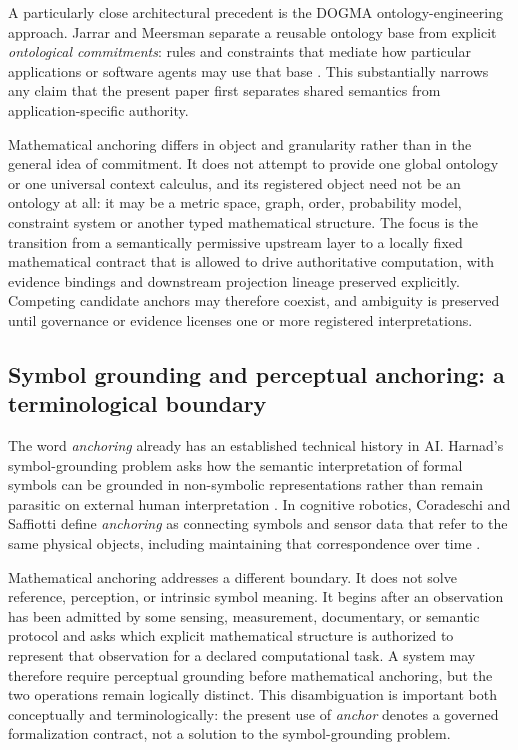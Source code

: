 \documentclass[11pt,a4paper]{article}
\begin{document}
A particularly close architectural precedent is the DOGMA ontology-engineering approach. Jarrar and Meersman separate a reusable ontology base from explicit \emph{ontological commitments}: rules and constraints that mediate how particular applications or software agents may use that base \cite{jarrarMeersman2002}. This substantially narrows any claim that the present paper first separates shared semantics from application-specific authority.

Mathematical anchoring differs in object and granularity rather than in the general idea of commitment. It does not attempt to provide one global ontology or one universal context calculus, and its registered object need not be an ontology at all: it may be a metric space, graph, order, probability model, constraint system or another typed mathematical structure. The focus is the transition from a semantically permissive upstream layer to a locally fixed mathematical contract that is allowed to drive authoritative computation, with evidence bindings and downstream projection lineage preserved explicitly. Competing candidate anchors may therefore coexist, and ambiguity is preserved until governance or evidence licenses one or more registered interpretations.

\subsection{Symbol grounding and perceptual anchoring: a terminological boundary}
The word \emph{anchoring} already has an established technical history in AI. Harnad's symbol-grounding problem asks how the semantic interpretation of formal symbols can be grounded in non-symbolic representations rather than remain parasitic on external human interpretation \cite{harnad1990}. In cognitive robotics, Coradeschi and Saffiotti define \emph{anchoring} as connecting symbols and sensor data that refer to the same physical objects, including maintaining that correspondence over time \cite{coradeschiSaffiotti2003}.

Mathematical anchoring addresses a different boundary. It does not solve reference, perception, or intrinsic symbol meaning. It begins after an observation has been admitted by some sensing, measurement, documentary, or semantic protocol and asks which explicit mathematical structure is authorized to represent that observation for a declared computational task. A system may therefore require perceptual grounding before mathematical anchoring, but the two operations remain logically distinct. This disambiguation is important both conceptually and terminologically: the present use of \emph{anchor} denotes a governed formalization contract, not a solution to the symbol-grounding problem.
\end{document}
